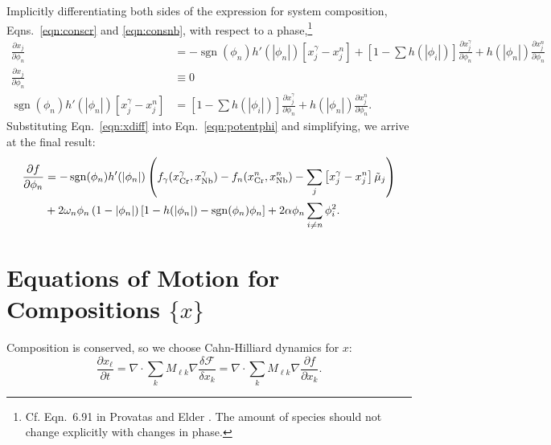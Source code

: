 \documentclass[10pt]{article}
\DeclareMathOperator{\sgn}{sgn}
\begin{document}
		Implicitly differentiating both sides of the expression for system composition,
		Eqns.~\ref{eqn:conscr} and \ref{eqn:consnb}, with respect to a phase,\footnote{
		Cf. Eqn.~6.91 in Provatas and Elder \cite{Provatas2010}. The amount of species should not change explicitly with changes in phase.
		}
		\begin{align}
			\frac{\partial x_j}{\partial \phi_n} &= -\sgn(\phi_n)h'(|\phi_n|)\left[x_j^{\gamma} - x_j^n\right]
			                                          + \left[1 - \sum h(|\phi_i|)\right] \frac{\partial x_j^{\gamma}}{\partial \phi_n}
			                                          + h(|\phi_n|) \frac{\partial x_j^{n}}{\partial \phi_n}\\
			\frac{\partial x_j}{\partial \phi_n} &\equiv 0\\
			\sgn(\phi_n)h'(|\phi_n|)\left[x_j^{\gamma} - x_j^n\right] &= \left[1 - \sum h(|\phi_i|)\right] \frac{\partial x_j^{\gamma}}{\partial \phi_n}
			                                                           + h(|\phi_n|) \frac{\partial x_j^{n}}{\partial \phi_n}.
			                                                           \label{eqn:xdiff}
		\end{align}
		Substituting Eqn.~\ref{eqn:xdiff} into Eqn.~\ref{eqn:potentphi} and simplifying,
		we arrive at the final result:
		\begin{align}\nonumber
			\frac{\partial f}{\partial \phi_n} &= -\sgn(\phi_n)h'(|\phi_n|)\left(f_{\gamma}(x_{\ce{Cr}}^{\gamma},x_{\ce{Nb}}^{\gamma})
			                                    - f_n(x_{\ce{Cr}}^n,x_{\ce{Nb}}^n) - \sum_j\left[x_j^{\gamma} - x_j^n\right]\tilde{\mu}_j\right)\\
			                                   &+ 2\omega_n\phi_n\left(1-|\phi_n|\right)\left[1 - h(|\phi_n|) - \sgn(\phi_n)\phi_n\right]
			                                    + 2\alpha\phi_n\sum_{i\neq n}\phi_i^2.
			\label{eqn:phieom}
		\end{align}		



	\section{Equations of Motion for Compositions $\{x\}$}
		Composition is conserved, so we choose Cahn-Hilliard dynamics for $x$:
		\begin{equation}
			\frac{\partial x_{\ell}}{\partial t} = \nabla\cdot\sum_k M_{\ell k}\nabla\frac{\delta\mathcal{F}}{\delta x_k}
			                                     = \nabla\cdot\sum_k M_{\ell k}\nabla\frac{\partial f}{\partial x_k}.\label{eqn:fick}
		\end{equation}
		
\end{document}
